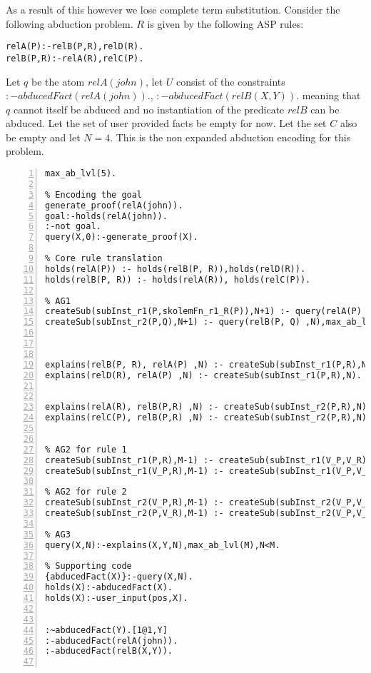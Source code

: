 As a result of this however we lose complete term substitution. Consider the following abduction problem. $R$ is given by the following ASP rules:
\begin{lstlisting}[frame=none]
relA(P):-relB(P,R),relD(R).
relB(P,R):-relA(R),relC(P).
\end{lstlisting}
Let $q$ be the atom $relA(john)$, let $U$ consist of the constraints $:-abducedFact(relA(john)).$, $:-abducedFact(relB(X,Y)).$ meaning that $q$ cannot itself be abduced and no instantiation of the predicate $relB$ can be abduced. Let the set of user provided facts be empty for now. Let the set $C$ also be empty and let $N = 4$. This is the non expanded abduction encoding for this problem. 
\begin{lstlisting}[numbers=left]
max_ab_lvl(5).

% Encoding the goal
generate_proof(relA(john)).
goal:-holds(relA(john)).
:-not goal.
query(X,0):-generate_proof(X).

% Core rule translation
holds(relA(P)) :- holds(relB(P, R)),holds(relD(R)).
holds(relB(P, R)) :- holds(relA(R)), holds(relC(P)).

% AG1
createSub(subInst_r1(P,skolemFn_r1_R(P)),N+1) :- query(relA(P) ,N),max_ab_lvl(M),N<M-1.
createSub(subInst_r2(P,Q),N+1) :- query(relB(P, Q) ,N),max_ab_lvl(M),N<M-1.



explains(relB(P, R), relA(P) ,N) :- createSub(subInst_r1(P,R),N).
explains(relD(R), relA(P) ,N) :- createSub(subInst_r1(P,R),N).


explains(relA(R), relB(P,R) ,N) :- createSub(subInst_r2(P,R),N).
explains(relC(P), relB(P,R) ,N) :- createSub(subInst_r2(P,R),N).


% AG2 for rule 1
createSub(subInst_r1(P,R),M-1) :- createSub(subInst_r1(V_P,V_R),N), N<M, holds(relB(P, R)),max_ab_lvl(M).
createSub(subInst_r1(V_P,R),M-1) :- createSub(subInst_r1(V_P,V_R),N), N<M, holds(relD(R)),max_ab_lvl(M).

% AG2 for rule 2
createSub(subInst_r2(V_P,R),M-1) :- createSub(subInst_r2(V_P,V_R),N), N<M, holds(relA(R)),max_ab_lvl(M).
createSub(subInst_r2(P,V_R),M-1) :- createSub(subInst_r2(V_P,V_R),N), N<M, holds(relC(P)),max_ab_lvl(M).

% AG3
query(X,N):-explains(X,Y,N),max_ab_lvl(M),N<M.

% Supporting code
{abducedFact(X)}:-query(X,N).
holds(X):-abducedFact(X).
holds(X):-user_input(pos,X).


:~abducedFact(Y).[1@1,Y]
:-abducedFact(relA(john)).
:-abducedFact(relB(X,Y)).


\end{lstlisting}
